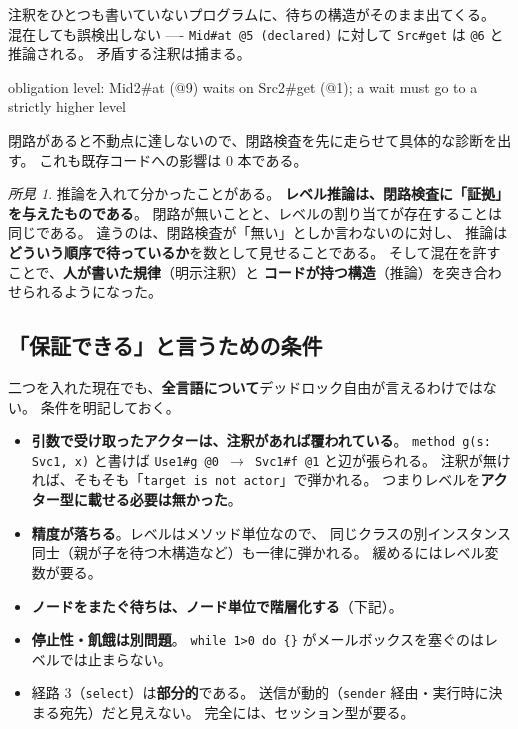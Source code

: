 \documentclass[11pt,a4paper]{ltjsarticle}
\theoremstyle{definition}
\theoremstyle{remark}
\newtheorem{finding}[theorem]{所見}
\begin{document}

注釈をひとつも書いていないプログラムに、待ちの構造がそのまま出てくる。
混在しても誤検出しない ---- \texttt{Mid\#at @5 (declared)} に対して
\texttt{Src\#get} は \texttt{@6} と推論される。
矛盾する注釈は捕まる。

\begin{term}
 obligation level: Mid2#at (@9) waits on Src2#get (@1);
             a wait must go to a strictly higher level
\end{term}

閉路があると不動点に達しないので、閉路検査を先に走らせて具体的な診断を出す。
これも既存コードへの影響は 0 本である。

\begin{finding}
推論を入れて分かったことがある。
\textbf{レベル推論は、閉路検査に「証拠」を与えたものである}。
閉路が無いことと、レベルの割り当てが存在することは同じである。
違うのは、閉路検査が「無い」としか言わないのに対し、
推論は\textbf{どういう順序で待っているか}を数として見せることである。
そして混在を許すことで、\textbf{人が書いた規律}（明示注釈）と
\textbf{コードが持つ構造}（推論）を突き合わせられるようになった。
\end{finding}

\subsection{「保証できる」と言うための条件}

二つを入れた現在でも、\textbf{全言語について}デッドロック自由が言えるわけではない。
条件を明記しておく。

\begin{itemize}
\item \textbf{引数で受け取ったアクターは、注釈があれば覆われている}。
      \texttt{method g(s: Svc1, x)} と書けば
      \texttt{Use1\#g @0 $\to$ Svc1\#f @1} と辺が張られる。
      注釈が無ければ、そもそも「\texttt{target is not actor}」で弾かれる。
      つまりレベルを\textbf{アクター型に載せる必要は無かった}。
\item \textbf{精度が落ちる}。レベルはメソッド単位なので、
      同じクラスの別インスタンス同士（親が子を待つ木構造など）も一律に弾かれる。
      緩めるにはレベル変数が要る。
\item \textbf{ノードをまたぐ待ちは、ノード単位で階層化する}（下記）。
\item \textbf{停止性・飢餓は別問題}。
      \texttt{while 1>0 do \{\}} がメールボックスを塞ぐのはレベルでは止まらない。
\item 経路 3（\texttt{select}）は\textbf{部分的}である。
      送信が動的（\texttt{sender} 経由・実行時に決まる宛先）だと見えない。
      完全には、セッション型が要る。
\end{itemize}
\end{document}
